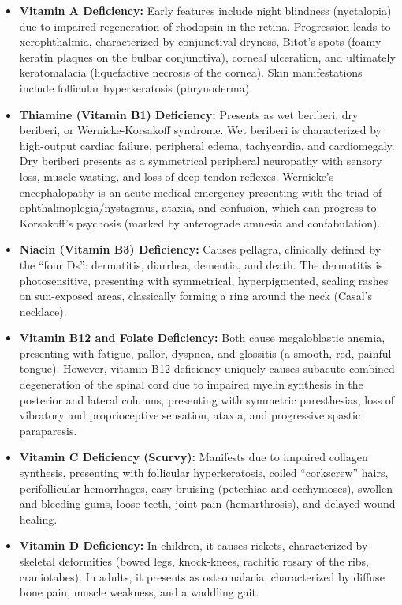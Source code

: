 \begin{itemize}
    \item \textbf{Vitamin A Deficiency:} Early features include night blindness (nyctalopia) due to impaired regeneration of rhodopsin in the retina. Progression leads to xerophthalmia, characterized by conjunctival dryness, Bitot's spots (foamy keratin plaques on the bulbar conjunctiva), corneal ulceration, and ultimately keratomalacia (liquefactive necrosis of the cornea). Skin manifestations include follicular hyperkeratosis (phrynoderma).
    \item \textbf{Thiamine (Vitamin B1) Deficiency:} Presents as wet beriberi, dry beriberi, or Wernicke-Korsakoff syndrome. Wet beriberi is characterized by high-output cardiac failure, peripheral edema, tachycardia, and cardiomegaly. Dry beriberi presents as a symmetrical peripheral neuropathy with sensory loss, muscle wasting, and loss of deep tendon reflexes. Wernicke's encephalopathy is an acute medical emergency presenting with the triad of ophthalmoplegia/nystagmus, ataxia, and confusion, which can progress to Korsakoff's psychosis (marked by anterograde amnesia and confabulation).
    \item \textbf{Niacin (Vitamin B3) Deficiency:} Causes pellagra, clinically defined by the ``four Ds'': dermatitis, diarrhea, dementia, and death. The dermatitis is photosensitive, presenting with symmetrical, hyperpigmented, scaling rashes on sun-exposed areas, classically forming a ring around the neck (Casal's necklace).
    \item \textbf{Vitamin B12 and Folate Deficiency:} Both cause megaloblastic anemia, presenting with fatigue, pallor, dyspnea, and glossitis (a smooth, red, painful tongue). However, vitamin B12 deficiency uniquely causes subacute combined degeneration of the spinal cord due to impaired myelin synthesis in the posterior and lateral columns, presenting with symmetric paresthesias, loss of vibratory and proprioceptive sensation, ataxia, and progressive spastic paraparesis.
    \item \textbf{Vitamin C Deficiency (Scurvy):} Manifests due to impaired collagen synthesis, presenting with follicular hyperkeratosis, coiled ``corkscrew'' hairs, perifollicular hemorrhages, easy bruising (petechiae and ecchymoses), swollen and bleeding gums, loose teeth, joint pain (hemarthrosis), and delayed wound healing.
    \item \textbf{Vitamin D Deficiency:} In children, it causes rickets, characterized by skeletal deformities (bowed legs, knock-knees, rachitic rosary of the ribs, craniotabes). In adults, it presents as osteomalacia, characterized by diffuse bone pain, muscle weakness, and a waddling gait.

\end{itemize}
